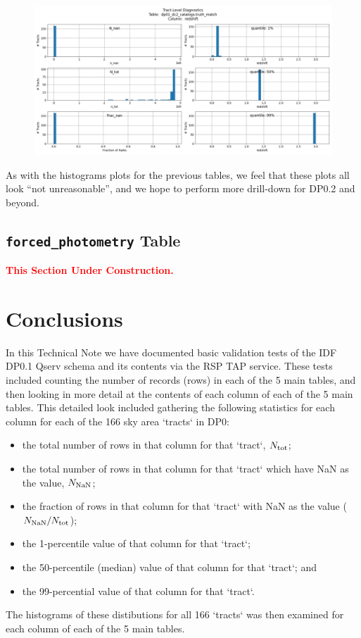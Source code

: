 \documentclass[DM,authoryear,toc]{lsstdoc}
\begin{document}
\begin{figure}[h]
\centering
\includegraphics[width=1.0\linewidth]{Plots/TAP_verify_DP01.dp01_dc2_catalogs.truth_match.redshift.pdf}
\caption{}
\label{fig:truth_match_redshift}
\end{figure}


As with the histograms plots for the previous tables, we feel that
these plots all look ``not unreasonable'', and we hope to perform more
drill-down for DP0.2 and beyond.


\subsection{\texttt{forced\_photometry} Table} \label{sec:forced_photometry}


\textcolor{red}{\bf{This Section Under Construction.}}


\section{Conclusions} \label{sec:conclusions}

In this Technical Note we have documented basic validation tests of
the IDF DP0.1 Qserv schema and its contents via the RSP TAP service.
These tests included counting the number of records (rows) in each of
the 5 main tables, and then looking in more detail at the contents of
each column of each of the 5 main tables.  This detailed look included
gathering the following statistics for each column for each of the 166
sky area `tracts` in DP0:
\begin{itemize}
\item the total number of rows in that column for that `tract`, $N_{\rm tot}$;
\item the total number of rows in that column for that `tract` which have NaN as the value, $N_{\rm NaN}$;
\item the fraction of rows in that column for that `tract` with NaN as the value ($N_{\rm NaN} / N_{\rm tot}$);
\item the 1-percentile value of that column for that `tract`;
\item the 50-percentile (median) value of that column for that `tract`; and 
\item the 99-percential value of that column for that `tract`.
\end{itemize}
The histograms of these distibutions for all 166 `tracts` was then
examined for each column of each of the 5 main tables.
\end{document}
